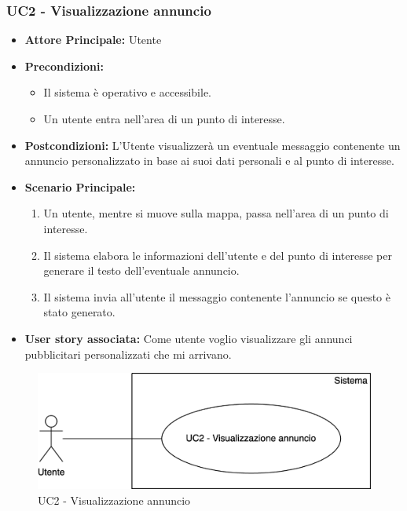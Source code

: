 \documentclass[11pt]{article}
\begin{document}
\begin{justify}
\subsubsection{\textbf{UC2 - Visualizzazione annuncio}}
\begin{itemize}
    \item \textbf{Attore Principale:} Utente
    \item \textbf{Precondizioni:} 
        \begin{itemize}
    	\item Il sistema è operativo e accessibile.
    	\item Un utente entra nell'area di un punto di interesse.
        \end{itemize}
    \item \textbf{Postcondizioni:} L'Utente visualizzerà un eventuale messaggio contenente un annuncio personalizzato in base ai suoi dati personali e al punto di interesse.
    \item \textbf{Scenario Principale:} 
        \begin{enumerate}
            \item Un utente, mentre si muove sulla mappa, passa    nell'area di un punto di interesse.
            \item Il sistema elabora le informazioni dell'utente e del punto di interesse per generare il testo dell'eventuale annuncio.
            \item Il sistema invia all'utente il messaggio contenente l'annuncio se questo è stato generato.
        \end{enumerate}
    \item \textbf{User story associata:} Come utente voglio visualizzare gli annunci pubblicitari personalizzati che mi arrivano.
\end{itemize}
\begin{figure}[ht]
    \centering
    \includegraphics[width=0.5\linewidth]{UC2image.png}
    \caption{UC2 - Visualizzazione annuncio}
    \label{fig:UC2}
\end{figure}

\end{justify}
\end{document}

